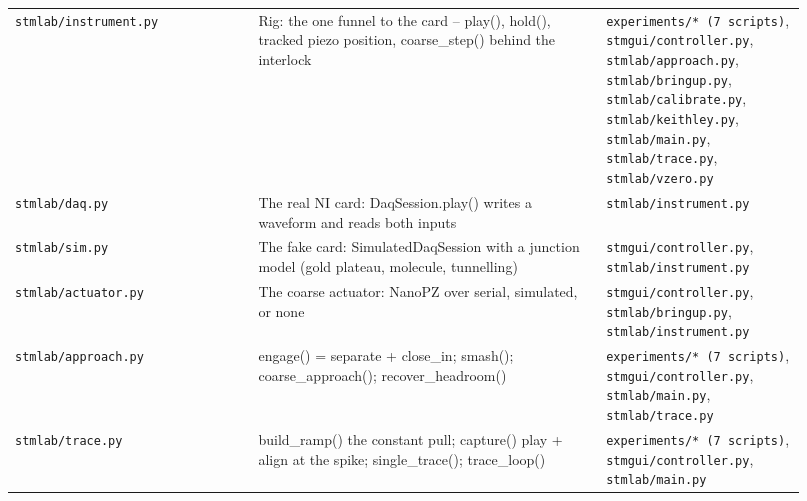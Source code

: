 \begin{longtable}{@{}>{\raggedright\arraybackslash}p{0.230\linewidth}>{\raggedright\arraybackslash}p{0.058\linewidth}>{\raggedright\arraybackslash}p{0.403\linewidth}>{\raggedright\arraybackslash}p{0.230\linewidth}@{}}
\texttt{stmlab/\discretionary{}{}{}instrument.\discretionary{}{}{}py} & 248 & Rig: the one funnel to the card -- play(), hold(), tracked piezo position, coarse\_step() behind the interlock & \texttt{experiments/\discretionary{}{}{}* (7 scripts)}, \texttt{stmgui/\discretionary{}{}{}controller.\discretionary{}{}{}py}, \texttt{stmlab/\discretionary{}{}{}approach.\discretionary{}{}{}py}, \texttt{stmlab/\discretionary{}{}{}bringup.\discretionary{}{}{}py}, \texttt{stmlab/\discretionary{}{}{}calibrate.\discretionary{}{}{}py}, \texttt{stmlab/\discretionary{}{}{}keithley.\discretionary{}{}{}py}, \texttt{stmlab/\discretionary{}{}{}main.\discretionary{}{}{}py}, \texttt{stmlab/\discretionary{}{}{}trace.\discretionary{}{}{}py}, \texttt{stmlab/\discretionary{}{}{}vzero.\discretionary{}{}{}py} \\
\texttt{stmlab/\discretionary{}{}{}daq.\discretionary{}{}{}py} & 229 & The real NI card: DaqSession.play() writes a waveform and reads both inputs & \texttt{stmlab/\discretionary{}{}{}instrument.\discretionary{}{}{}py} \\
\texttt{stmlab/\discretionary{}{}{}sim.\discretionary{}{}{}py} & 214 & The fake card: SimulatedDaqSession with a junction model (gold plateau, molecule, tunnelling) & \texttt{stmgui/\discretionary{}{}{}controller.\discretionary{}{}{}py}, \texttt{stmlab/\discretionary{}{}{}instrument.\discretionary{}{}{}py} \\
\texttt{stmlab/\discretionary{}{}{}actuator.\discretionary{}{}{}py} & 218 & The coarse actuator: NanoPZ over serial, simulated, or none & \texttt{stmgui/\discretionary{}{}{}controller.\discretionary{}{}{}py}, \texttt{stmlab/\discretionary{}{}{}bringup.\discretionary{}{}{}py}, \texttt{stmlab/\discretionary{}{}{}instrument.\discretionary{}{}{}py} \\
\texttt{stmlab/\discretionary{}{}{}approach.\discretionary{}{}{}py} & 188 & engage() = separate + close\_in; smash(); coarse\_approach(); recover\_headroom() & \texttt{experiments/\discretionary{}{}{}* (7 scripts)}, \texttt{stmgui/\discretionary{}{}{}controller.\discretionary{}{}{}py}, \texttt{stmlab/\discretionary{}{}{}main.\discretionary{}{}{}py}, \texttt{stmlab/\discretionary{}{}{}trace.\discretionary{}{}{}py} \\
\texttt{stmlab/\discretionary{}{}{}trace.\discretionary{}{}{}py} & 301 & build\_ramp() the constant pull; capture() play + align at the spike; single\_trace(); trace\_loop() & \texttt{experiments/\discretionary{}{}{}* (7 scripts)}, \texttt{stmgui/\discretionary{}{}{}controller.\discretionary{}{}{}py}, \texttt{stmlab/\discretionary{}{}{}main.\discretionary{}{}{}py} \\

\end{longtable}
